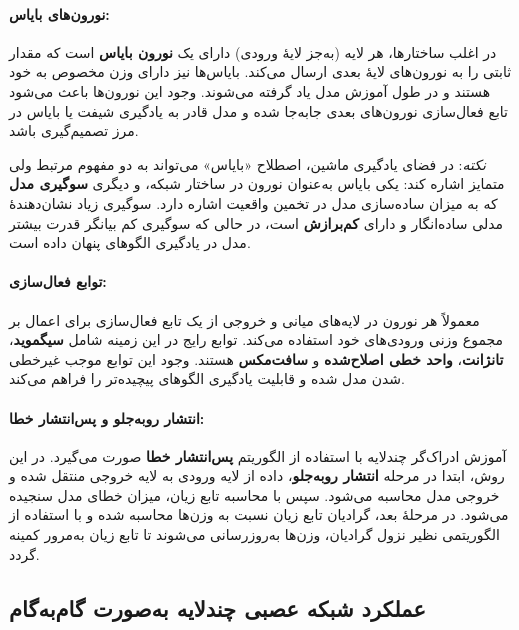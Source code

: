 \paragraph{نورون‌های بایاس:}
در اغلب ساختارها، هر لایه (به‌جز لایهٔ ورودی) دارای یک \textbf{نورون بایاس} است که مقدار ثابتی را به نورون‌های لایهٔ بعدی ارسال می‌کند. بایاس‌ها نیز دارای وزن مخصوص به خود هستند و در طول آموزش مدل یاد گرفته می‌شوند. وجود این نورون‌ها باعث می‌شود تابع فعال‌سازی نورون‌های بعدی جابه‌جا شده و مدل قادر به یادگیری شیفت یا بایاس در مرز تصمیم‌گیری باشد.

\textit{نکته}: در فضای یادگیری ماشین، اصطلاح «بایاس» می‌تواند به دو مفهوم مرتبط ولی متمایز اشاره کند: یکی بایاس به‌عنوان نورون در ساختار شبکه، و دیگری \textbf{سوگیری مدل} که به میزان ساده‌سازی مدل در تخمین واقعیت اشاره دارد. سوگیری زیاد نشان‌دهندهٔ مدلی ساده‌انگار و دارای \textbf{کم‌برازش} است، در حالی که سوگیری کم بیانگر قدرت بیشتر مدل در یادگیری الگوهای پنهان داده است.

\paragraph{توابع فعال‌سازی:}
معمولاً هر نورون در لایه‌های میانی و خروجی از یک تابع فعال‌سازی برای اعمال بر مجموع وزنی ورودی‌های خود استفاده می‌کند. توابع رایج در این زمینه شامل \textbf{سیگموید}، \textbf{تانژانت}، \textbf{واحد خطی اصلاح‌شده} و \textbf{سافت‌مکس} هستند. وجود این توابع موجب غیرخطی شدن مدل شده و قابلیت یادگیری الگوهای پیچیده‌تر را فراهم می‌کند.

\paragraph{انتشار روبه‌جلو و پس‌انتشار خطا:}
آموزش ادراک‌گر چندلایه با استفاده از الگوریتم \textbf{پس‌انتشار خطا} صورت می‌گیرد. در این روش، ابتدا در مرحله \textbf{انتشار روبه‌جلو}، داده از لایه ورودی به لایه خروجی منتقل شده و خروجی مدل محاسبه می‌شود. سپس با محاسبه تابع زیان، میزان خطای مدل سنجیده می‌شود. در مرحلهٔ بعد، گرادیان تابع زیان نسبت به وزن‌ها محاسبه شده و با استفاده از الگوریتمی نظیر نزول گرادیان، وزن‌ها به‌روزرسانی می‌شوند تا تابع زیان به‌مرور کمینه گردد.


\subsection*{عملکرد شبکه عصبی چندلایه به‌صورت گام‌به‌گام}


